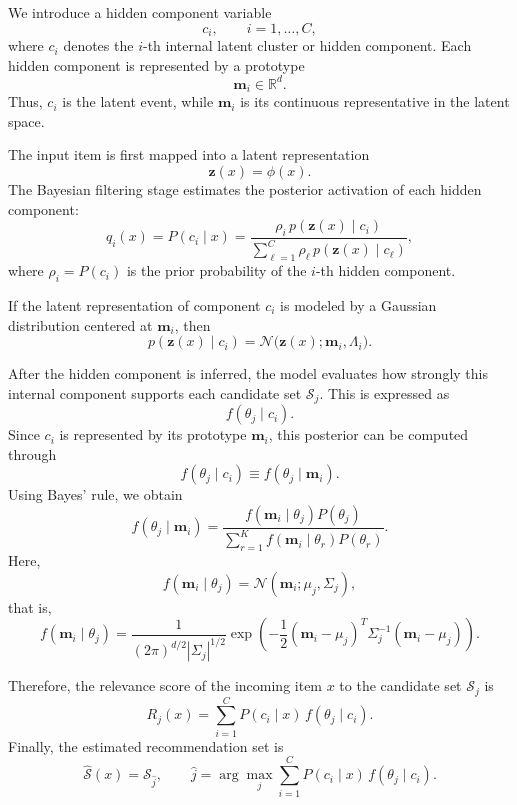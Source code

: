 \documentclass{article}
\begin{document}
We introduce a hidden component variable
\[
c_i,\qquad i=1,\ldots,C,
\]
where \(c_i\) denotes the \(i\)-th internal latent cluster or hidden component. Each hidden component is represented by a prototype
\[
\mathbf{m}_i\in\mathbb{R}^{d}.
\]
Thus, \(c_i\) is the latent event, while \(\mathbf{m}_i\) is its continuous representative in the latent space.

The input item is first mapped into a latent representation
\[
\mathbf{z}(x)=\phi(x).
\]
The Bayesian filtering stage estimates the posterior activation of each hidden component:
\[
q_i(x)
=
P(c_i\mid x)
=
\frac{
	\rho_i\,p(\mathbf{z}(x)\mid c_i)
}{
	\sum_{\ell=1}^{C}
	\rho_\ell\,p(\mathbf{z}(x)\mid c_\ell)
},
\]
where \(\rho_i=P(c_i)\) is the prior probability of the \(i\)-th hidden component.

If the latent representation of component \(c_i\) is modeled by a Gaussian distribution centered at \(\mathbf{m}_i\), then
\[
p(\mathbf{z}(x)\mid c_i)
=
\mathcal{N}\big(\mathbf{z}(x);\mathbf{m}_i,\Lambda_i\big).
\]

After the hidden component is inferred, the model evaluates how strongly this internal component supports each candidate set \(\mathcal{S}_j\). This is expressed as
\[
f(\theta_j\mid c_i).
\]
Since \(c_i\) is represented by its prototype \(\mathbf{m}_i\), this posterior can be computed through
\[
f(\theta_j\mid c_i)
\equiv
f(\theta_j\mid \mathbf{m}_i).
\]
Using Bayes' rule, we obtain
\[
f(\theta_j\mid \mathbf{m}_i)
=
\frac{
	f(\mathbf{m}_i\mid \theta_j)P(\theta_j)
}{
	\sum_{r=1}^{K}
	f(\mathbf{m}_i\mid \theta_r)P(\theta_r)
}.
\]
Here,
\[
f(\mathbf{m}_i\mid \theta_j)
=
\mathcal{N}(\mathbf{m}_i;\mu_j,\Sigma_j),
\]
that is,
\[
f(\mathbf{m}_i\mid \theta_j)
=
\frac{1}{(2\pi)^{d/2}|\Sigma_j|^{1/2}}
\exp\left(
-\frac{1}{2}
(\mathbf{m}_i-\mu_j)^T
\Sigma_j^{-1}
(\mathbf{m}_i-\mu_j)
\right).
\]

Therefore, the relevance score of the incoming item \(x\) to the candidate set \(\mathcal{S}_j\) is
\[
R_j(x)
=
\sum_{i=1}^{C}
P(c_i\mid x)\,
f(\theta_j\mid c_i).
\]
Finally, the estimated recommendation set is
\[
\widehat{\mathcal{S}}(x)
=
\mathcal{S}_{\widehat{j}},
\qquad
\widehat{j}
=
\arg\max_{j}
\sum_{i=1}^{C}
P(c_i\mid x)\,
f(\theta_j\mid c_i).
\]
\end{document}
